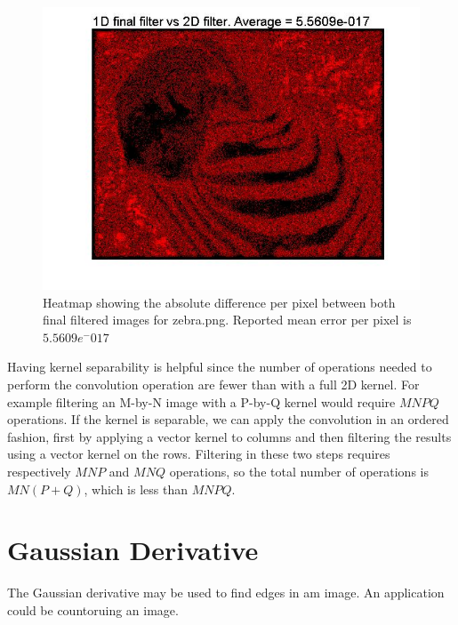 \documentclass[11pt]{article}
\begin{document}
\begin{figure}[H] \centering
	\includegraphics[width=.9\textwidth]{imgs/zebra_heatmap.jpg}
	\caption{Heatmap showing the absolute difference per pixel between both
		final filtered images for zebra.png. Reported mean error per pixel is
		$5.5609 e^-017$}
	\label{fig:zebra_heatmap}
\end{figure}

Having kernel separability is helpful since the number of operations needed to
perform the convolution operation are fewer than with a full 2D kernel. For
example filtering an M-by-N image with a P-by-Q kernel would require $MNPQ$
operations. If the kernel is separable, we can apply the convolution in an
ordered fashion, first by applying a vector kernel to columns and then filtering
the results using a vector kernel on the rows. Filtering in these two steps
requires respectively $MNP$ and $MNQ$ operations, so the total number of
operations is $MN(P + Q)$, which is less than $MNPQ$.

\section{Gaussian Derivative}


The Gaussian derivative may be used to find edges in am image. An application
could be countoruing an image.
\end{document}

